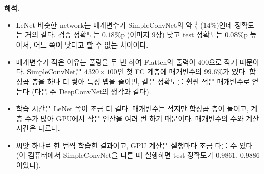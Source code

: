 \documentclass[11pt,a4paper]{article}
\begin{document}
\begin{problems}
\begin{sol}
\textbf{해석.}
\begin{itemize}[leftmargin=1.5em,itemsep=2pt]
\item LeNet 비슷한 network는 매개변수가 SimpleConvNet의 약 $\frac17$ ($14\%$)인데 정확도는 거의 같다.
검증 정확도는 $0.18\%$p (이미지 $9$장) 낮고 test 정확도는 $0.08\%$p 높아서, 어느 쪽이 낫다고 할 수 없는 차이이다.
\item 매개변수가 적은 이유는 풀링을 두 번 하여 Flatten의 출력이 $400$으로 작기 때문이다.
SimpleConvNet은 $4320\times100$인 첫 FC 계층에 매개변수의 $99.6\%$가 있다.
합성곱 층을 하나 더 쌓아 특징 맵을 줄이면, 같은 정확도를 훨씬 적은 매개변수로 얻는다 (다음 주 DeepConvNet의 생각과 같다).
\item 학습 시간은 LeNet 쪽이 조금 더 길다. 매개변수는 적지만 합성곱 층이 둘이고, 계층 수가 많아 GPU에서 작은 연산을 여러 번 하기 때문이다.
매개변수의 수와 계산 시간은 다르다.
\item 씨앗 하나로 한 번씩 학습한 결과이고, GPU 계산은 실행마다 조금 다를 수 있다
(이 컴퓨터에서 SimpleConvNet을 다른 때 실행하면 test 정확도가 $0.9861$, $0.9886$이었다).
\end{itemize}
\end{sol}

\end{problems}
\end{document}

